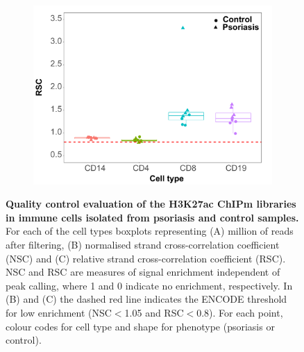 \begin{figure}[htbp]
\begin{subfigure}{0.50\textwidth}
\includegraphics[width=\textwidth]{./Results2/pdfs/ChIPm_PS_CTL_RSC_boxplot}
\caption{}
\end{subfigure}
\caption[Quality control evaluation of the H3K27ac ChIPm libraries in immune cells isolated from psoriasis and control samples.]{\textbf{Quality control evaluation of the H3K27ac ChIPm libraries in immune cells isolated from psoriasis and control samples.} For each of the cell types boxplots representing (A) million of reads after filtering, (B) normalised strand cross-correlation coefficient (NSC) and (C) relative strand cross-correlation coefficient (RSC). NSC and RSC are measures of signal enrichment independent of peak calling, where 1 and 0 indicate no enrichment, respectively. In (B) and (C) the dashed red line indicates the ENCODE threshold for low enrichment (NSC$<$1.05 and RSC$<$0.8). For each point, colour codes for cell type and shape for phenotype (psoriasis or control).}
\label{figure:ChIPm_PS_CTL_QC}
\end{figure} 





